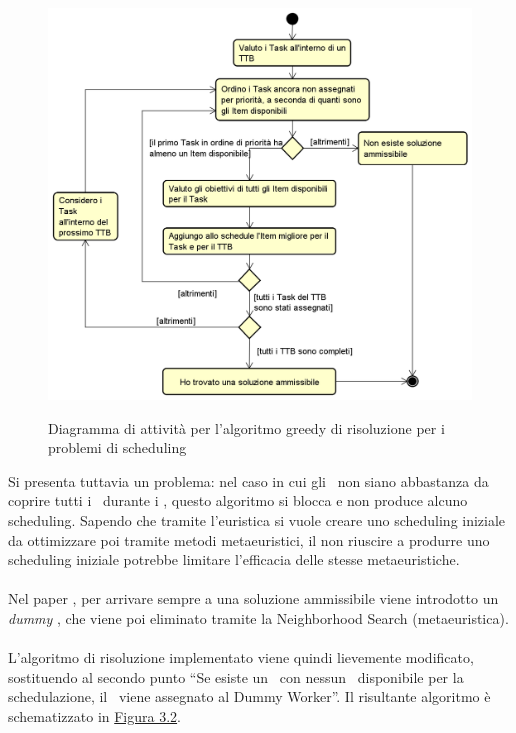 \begin{figure}[!h]
    \begin{widepage}
        \label{fig31}
        \includegraphics[width=16cm,keepaspectratio]{../immagini/algoritmo.png}
        \caption{Diagramma di attività per l'algoritmo greedy di risoluzione per i problemi di scheduling}
    \end{widepage}
\end{figure}
\FloatBarrier
\noindent
Si presenta tuttavia un problema: nel caso in cui gli \items\ non siano abbastanza da coprire tutti i \task\ durante i \ttb, questo algoritmo si blocca e non produce alcuno scheduling. Sapendo che tramite l'euristica si vuole creare uno scheduling iniziale da ottimizzare poi tramite metodi metaeuristici, il non riuscire a produrre uno scheduling iniziale potrebbe limitare l'efficacia delle stesse metaeuristiche. \\
\\
Nel paper \cite{paper:dummy}, per arrivare sempre a una soluzione ammissibile viene introdotto un \emph{\gls{dummy}}\glsfirstoccur
, che viene poi eliminato tramite la Neighborhood Search (metaeuristica). \\
\\
L'algoritmo di risoluzione implementato viene quindi lievemente modificato, sostituendo al secondo punto ``Se esiste un \task\ con nessun \items\ disponibile per la schedulazione, il \task\ viene assegnato al Dummy Worker''. Il risultante algoritmo è schematizzato in \hyperref[fig32]{Figura 3.2}.
